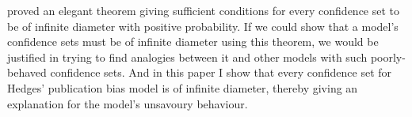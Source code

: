 \textcite{Gleser1987-ii} proved an elegant theorem giving sufficient conditions for every confidence set to be of infinite diameter with positive probability. If we could show that a model's confidence sets must be of infinite diameter using this theorem, we would be justified in trying to find analogies between it and other models with such poorly-behaved confidence sets. And in this paper I show that every confidence set for Hedges' publication bias model is of infinite diameter, thereby giving an explanation for the model's unsavoury behaviour.